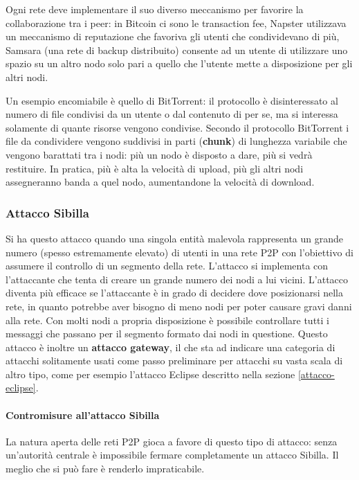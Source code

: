 Ogni rete deve implementare il suo diverso meccanismo per favorire la collaborazione tra i peer: in Bitcoin ci sono le transaction fee, Napster utilizzava un meccanismo di reputazione che favoriva gli utenti che condividevano di più, Samsara (una rete di backup distribuito) consente ad un utente di utilizzare uno spazio su un altro nodo solo pari a quello che l'utente mette a disposizione per gli altri nodi.

Un esempio encomiabile è quello di BitTorrent: il protocollo è disinteressato al numero di file condivisi da un utente o dal contenuto di per se, ma si interessa solamente di quante risorse vengono condivise. Secondo il protocollo BitTorrent i file da condividere vengono suddivisi in parti (\textbf{chunk}) di lunghezza variabile che vengono barattati tra i nodi: più un nodo è disposto a dare, più si vedrà restituire. In pratica, più è alta la velocità di upload, più gli altri nodi assegneranno banda a quel nodo, aumentandone la velocità di download.

\subsubsection{Attacco Sibilla}\label{attacco-sibilla}

Si ha questo attacco quando una singola entità malevola rappresenta un grande numero (spesso estremamente elevato) di utenti in una rete P2P con l'obiettivo di assumere il controllo di un segmento della rete. L'attacco si implementa con l'attaccante che tenta di creare un grande numero dei nodi a lui vicini. L'attacco diventa più efficace se l'attaccante è in grado di decidere dove posizionarsi nella rete, in quanto potrebbe aver bisogno di meno nodi per poter causare gravi danni alla rete. Con molti nodi a propria disposizione è possibile controllare tutti i messaggi che passano per il segmento formato dai nodi in questione. Questo attacco è inoltre un \textbf{attacco gateway}, il che sta ad indicare una categoria di attacchi solitamente usati come passo preliminare per attacchi su vasta scala di altro tipo, come per esempio l'attacco Eclipse descritto nella sezione \ref{attacco-eclipse}.

\paragraph{Contromisure all'attacco Sibilla}\label{contromisure-allattacco-sibilla}

La natura aperta delle reti P2P gioca a favore di questo tipo di attacco: senza un'autorità centrale è impossibile fermare completamente un attacco Sibilla. Il meglio che si può fare è renderlo impraticabile.

